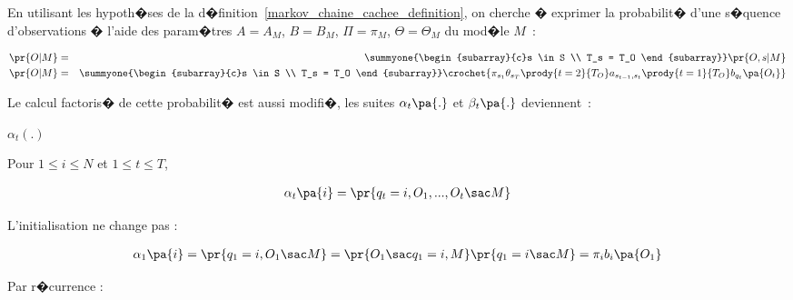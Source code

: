         

En utilisant les hypoth�ses de la d�finition~\ref{markov_chaine_cachee_definition}, on cherche � exprimer la probabilit� d'une s�quence
d'observations � l'aide des param�tres $A=A_M$, $B=B_M$, $\Pi=\pi_M$, $\Theta=\Theta_M$ du mod�le $M$~:

        \begin{eqnarray}
        \pr{O|M} &=&   \summyone{\begin{subarray}{c}s \in S \\ T_s = T_O \end{subarray}}
                        \pr{O,s|M} \nonumber\\
        \pr{O|M} &=&   \summyone{\begin{subarray}{c}s \in S \\ T_s = T_O \end{subarray}}
                        \crochet{ \pi_{s_1} \theta_{s_T} \prody{t=2}{T_O}a_{s_{t-1},s_t}
                             \prody{t=1}{T_O} b_{q_t}\pa{O_t} } \label{mmc_expression_proba_seq_es}
        \end{eqnarray}




Le calcul factoris� de cette probabilit� est aussi modifi�, les suites $\alpha_t\pa{.}$ et $\beta_t\pa{.}$ deviennent~:




$\alpha_{t}\left(  .\right)  $

\label{hmm_calcul_alpha}
%
\label{hmm_calcul_alpha}%

Pour $1\leqslant i\leqslant N$ et $1\leqslant t\leqslant T$,

        \begin{eqnarray}
        \alpha _{t} \pa{i}  = \pr{ q_{t}=i,O_{1},...,O_{t} \sac  M} \label{hmm_eq_alpha_es_1}
        \end{eqnarray}

L'initialisation ne change pas :

        \begin{eqnarray}
        \alpha_{1}\pa{i}  = \pr{   q_{1}=i,O_{1} \sac  M } = \pr { O_{1} \sac q_{1}=i,M} \pr { q_{1}=i \sac M}  = \pi_{i}b_{i}\pa{O_{1}}
        \label{hmm_eq_alpha_es_2}
        \end{eqnarray}

Par r�currence :

